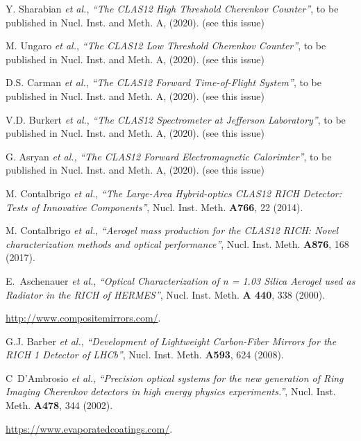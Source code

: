 \documentclass[5p,times,twocolumn]{elsarticle}
\begin{document}
\begin{thebibliography}{00}
Y. Sharabian {\it et al.}, {\it ``The CLAS12 High Threshold Cherenkov Counter''}, 
to be published in Nucl. Inst.  and Meth. A, (2020). (see this issue)
  
M. Ungaro {\it et al.}, {\it ``The CLAS12 Low Threshold Cherenkov Counter''}, 
to be published in Nucl. Inst.  and Meth. A, (2020). (see this issue)

D.S. Carman {\it et al.}, {\it ``The CLAS12 Forward Time-of-Flight System''}, 
to be published in Nucl. Inst.  and Meth. A, (2020). (see this issue)
  
V.D. Burkert {\it et al.}, {\it ``The CLAS12 Spectrometer at Jefferson Laboratory''}, 
to be published in Nucl. Inst.  and Meth. A, (2020). (see this issue)
  
G. Asryan {\it et al.}, {\it ``The CLAS12 Forward Electromagnetic Calorimter''}, 
to be published in Nucl. Inst.  and Meth. A, (2020). (see this issue)
  
M. Contalbrigo {\it et al.}, {\it ``The Large-Area Hybrid-optics CLAS12 RICH Detector: Tests of Innovative Components''},
Nucl. Inst. Meth. {\bf A766}, 22 (2014).

M. Contalbrigo {\it et al.}, {\it ``Aerogel mass production for the CLAS12 RICH: Novel characterization methods and optical performance''},
Nucl. Inst. Meth. {\bf A876}, 168 (2017).

E.~Aschenauer  {\it et al.}, {\it ``Optical Characterization of n = 1.03 Silica Aerogel used as Radiator in the RICH of HERMES''},
Nucl. Inst. Meth. {\bf A 440}, 338 (2000).

 \url{http://www.compositemirrors.com/}.

G.J. Barber {\it et al.}, {\it ``Development of Lightweight Carbon-Fiber Mirrors for the RICH 1 Detector of LHCb''},
Nucl. Inst. Meth. {\bf A593}, 624 (2008).

C~D'Ambrosio {\it et al.}, {\it ``Precision optical systems for the new generation of Ring Imaging Cherenkov detectors in high
energy physics experiments.''},
Nucl. Inst. Meth. {\bf A478}, 344 (2002).

 \url{https://www.evaporatedcoatings.com/}.


\end{thebibliography}
\end{document}
